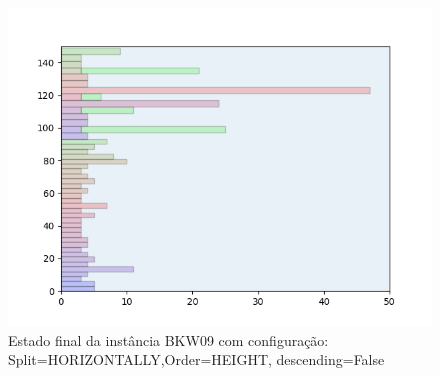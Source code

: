 \begin{figure}[H]
    \centering
    \caption[]{Estado final da instância BKW09 com configuração: Split=HORIZONTALLY,Order=HEIGHT, descending=False}
    \label{fig:bkw09-horizontally-height-false}
    \includegraphics[scale=0.5]{output/figures/bkw/bkw09/horizontally/height/false/000}
\end{figure}